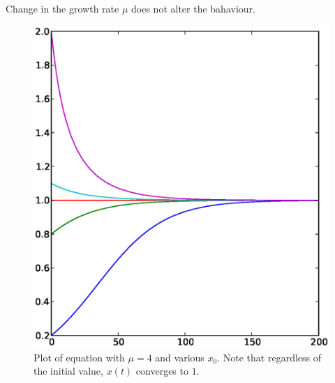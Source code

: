 \documentclass[11pt]{article}
\begin{document}
Change in the growth rate $\mu$ does not alter the bahaviour.
\begin{figure}[htb]
  \begin{center}
    \includegraphics[scale=0.5]{logistic_diffeq_mu4_varyingx0.eps}
  \end{center}
  \caption{
    Plot of equation  with $\mu = 4$ and various $x_0$. 
  Note that regardless of the initial value, $x(t)$ converges to $1$.
}
  \label{fig:logistic_diffeq1}
\end{figure}
\end{document}
